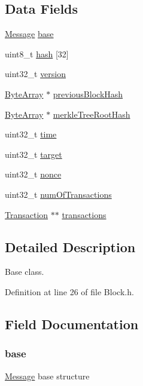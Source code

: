 \subsection*{Data Fields}
\begin{DoxyCompactItemize}
\item 
\hyperlink{struct_message}{Message} \hyperlink{struct_block_a8987f797adf70c3e174fd64cc68bc933}{base}
\item 
uint8\_\-t \hyperlink{struct_block_a7ff9da008bf055da1f1ba994c562057d}{hash} \mbox{[}32\mbox{]}
\item 
uint32\_\-t \hyperlink{struct_block_acd99bb05ca015e7d74448acb1deba7ca}{version}
\item 
\hyperlink{struct_byte_array}{ByteArray} $\ast$ \hyperlink{struct_block_ac5cb79d8f66809a5f75592e22db9be2c}{previousBlockHash}
\item 
\hyperlink{struct_byte_array}{ByteArray} $\ast$ \hyperlink{struct_block_a51d24d9b04212dc52192636948a05a4c}{merkleTreeRootHash}
\item 
uint32\_\-t \hyperlink{struct_block_ae73654f333e4363463ad8c594eca1905}{time}
\item 
uint32\_\-t \hyperlink{struct_block_a695e5800ad1fd403c0e72d918eaec97c}{target}
\item 
uint32\_\-t \hyperlink{struct_block_aa2f9785a9d9116cc4592db06375cb887}{nonce}
\item 
uint32\_\-t \hyperlink{struct_block_ac9749ca92207f8d50ecc2b0f904e2424}{numOfTransactions}
\item 
\hyperlink{struct_transaction}{Transaction} $\ast$$\ast$ \hyperlink{struct_block_acf585c1809511c4f5b5366bb2bc2e855}{transactions}
\end{DoxyCompactItemize}


\subsection{Detailed Description}
Base class. 

Definition at line 26 of file Block.h.



\subsection{Field Documentation}
\hypertarget{struct_block_a8987f797adf70c3e174fd64cc68bc933}{
\subsubsection[{base}]{ {\bf base}}}
\label{struct_block_a8987f797adf70c3e174fd64cc68bc933}
\hyperlink{struct_message}{Message} base structure 

